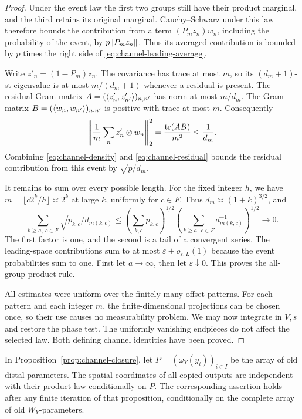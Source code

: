 \begin{proof}
Under the event law the first two groups still have their product
marginal, and the third retains its original marginal.  Cauchy--Schwarz
under this law therefore bounds the contribution from a term
$(P_mz_n)w_n$, including the probability of the event, by
$p\lVert P_mz_n\rVert$.  Thus its averaged contribution is bounded by
$p$ times the right side of \eqref{eq:channel-leading-average}.

Write $z'_n=(1-P_m)z_n$.  The covariance has trace at most $m$, so its
$(d_m+1)$-st eigenvalue is at most $m/(d_m+1)$ whenever a residual is
present.  The residual Gram matrix $A=(\langle z'_n,z'_{n'}\rangle)_{n,n'}$
has norm at most $m/d_m$.  The Gram matrix
$B=(\langle w_n,w_{n'}\rangle)_{n,n'}$ is positive with trace at most $m$.
Consequently
\begin{equation}\label{eq:channel-residual}
 \left\|\frac1m\sum_n z'_n\otimes w_n\right\|_2^2
       =\frac{\operatorname{tr}(AB)}{m^2}\le\frac1{d_m}.
\end{equation}
Combining \eqref{eq:channel-density} and
\eqref{eq:channel-residual} bounds the residual contribution from
this event by $\sqrt{p/d_m}$.

It remains to sum over every possible length.  For the fixed integer
$h$, we have $m=\lfloor c2^k/h\rfloor\asymp2^k$ at large $k$,
uniformly for $c\in F$.  Thus $d_m\asymp(1+k)^{3/2}$, and
\begin{equation}\label{eq:channel-tail}
 \sum_{k\ge a,\ c\in F}\sqrt{p_{k,c}/d_{m(k,c)}}
 \le\left(\sum_{k,c}p_{k,c}\right)^{1/2}
      \left(\sum_{k\ge a,\ c\in F}d_{m(k,c)}^{-1}\right)^{1/2}
                 \longrightarrow0.
\end{equation}
The first factor is one, and the second is a tail of a convergent
series.  The leading-space contributions sum to at most
$\varepsilon+o_{\varepsilon,L}(1)$ because the event probabilities
sum to one.  First let $a\to\infty$, then let $\varepsilon\downarrow0$.
This proves the all-group product rule.

All estimates were uniform over the finitely many offset patterns.
For each pattern and each integer $m$, the finite-dimensional
projections can be chosen once, so their use causes no measurability
problem.  We may now integrate in $V,s$ and restore the phase test.
The uniformly vanishing endpieces do not affect the selected law.
Both defining channel identities have been proved.
\end{proof}

\begin{corollary}\label{cor:channel-array-distal}
In Proposition~\ref{prop:channel-closure}, let
$P=(\omega_Y(y_i))_{i\in I}$ be the array of old distal parameters.
The spatial coordinates of all copied outputs are independent with
their product law conditionally on $P$.  The corresponding assertion
holds after any finite iteration of that proposition, conditionally
on the complete array of old $W_Y$-parameters.
\end{corollary}

